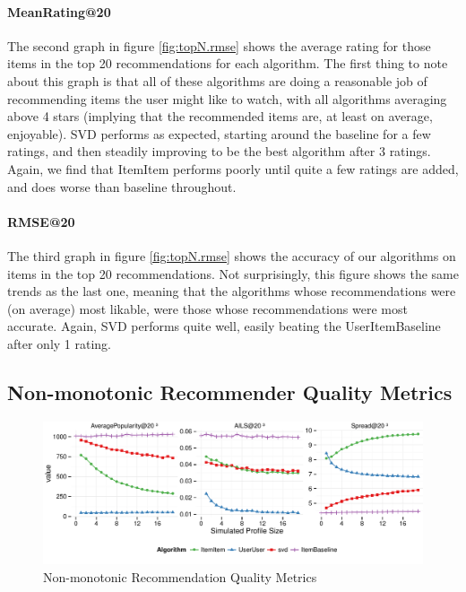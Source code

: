 \documentclass[letterpaper]{sig-alternate}
\begin{document}
  \paragraph{MeanRating@20}
  The second graph in figure \ref{fig:topN.rmse} shows the average rating for those items in the top 20 recommendations for each algorithm.
  The first thing to note about this graph is that all of these algorithms are doing a reasonable job of recommending items the user might like to watch, with all algorithms averaging above 4 stars (implying that the recommended items are, at least on average, enjoyable).
  SVD performs as expected, starting around the baseline for a few ratings, and then steadily improving to be the best algorithm after 3 ratings.
  Again, we find that ItemItem performs poorly until quite a few ratings are added, and does worse than baseline throughout.
    

  \paragraph{RMSE@20}
  The third graph in figure \ref{fig:topN.rmse} shows the accuracy of our algorithms on items in the top 20 recommendations.
  Not surprisingly, this figure shows the same trends as the last one, meaning that the algorithms whose recommendations were (on average) most likable, were those whose recommendations were most accurate.
  Again, SVD performs quite well, easily beating the UserItemBaseline after only 1 rating.
  


\subsection*{Non-monotonic Recommender Quality Metrics}
\vspace{-1.5em}
\begin{figure}[ht!]
  \centering
  \includegraphics[width=\linewidth]{../lenskit/output/ekstrandTuned20/popdiv.pdf}
  \caption{Non-monotonic Recommendation Quality Metrics}
  \label{fig:pop}
\end{figure}
%
\end{document}
